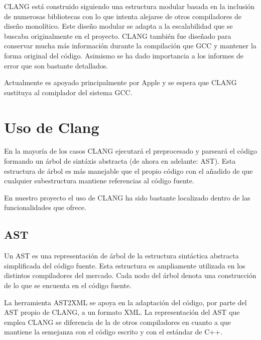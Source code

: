 CLANG est\'a construido siguiendo una estructura modular basada en la inclusi\'on de numerosas bibliotecas con lo que intenta alejarse de otros compiladores de dise\~no monol\'itico. Este dise\~no modular se adapta a la escalabilidad que se buscaba originalmente en el proyecto. CLANG tambi\'en fue dise\~nado para conservar mucha m\'as informaci\'on durante la compilaci\'on que GCC y mantener la forma original del c\'odigo. Asimismo se ha dado importancia a los informes de error que son bastante detallados.

Actualmente es apoyado principalmente por Apple y se espera que CLANG sustituya al comiplador del sistema GCC.

\section{Uso de Clang}

En la mayor\'ia de los casos CLANG ejecutar\'a el preprocesado y parsear\'a el c\'odigo formando un \'arbol de sint\'axis abstracta (de ahora en adelante: AST). Esta estructura de \'arbol es m\'as manejable que el propio c\'odigo con el a\~nadido de que cualquier subestructura mantiene referencias al c\'odigo fuente.

En nuestro proyecto el uso de CLANG ha sido bastante localizado dentro de las funcionalidades que ofrece.

\subsection{AST}

Un AST es una representaci\'on de \'arbol de la estructura sint\'actica abstracta simplificada del c\'odigo fuente. Esta estructura es ampliamente utilizada en los distintos compiladores del mercado. Cada nodo del \'arbol denota una construcci\'on de lo que se encuenta en el c\'odigo fuente.

La herramienta AST2XML se apoya en la adaptaci\'on del c\'odigo, por parte del AST propio de CLANG, a un formato XML. La representaci\'on del AST que emplea CLANG se diferencia de la de otros compiladores en cuanto a que mantiene la semejanza con el c\'odigo escrito y con el est\'andar de C++.

